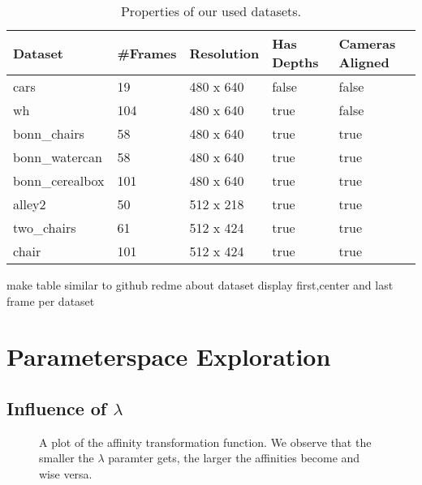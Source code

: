 \begin{table}[H]
\centering
\begin{tabular}{|l|l|l|l|l|}
\hline
\textbf{Dataset} & \textbf{\#Frames} & \textbf{Resolution} & \textbf{Has Depths} & \textbf{Cameras Aligned} \\ \hline
cars & 19 & 480 x 640 & false & false \\ \hline
wh & 104 & 480 x 640 & true & false \\ \hline
bonn\_chairs & 58 & 480 x 640 & true & true \\ \hline
bonn\_watercan & 58 & 480 x 640 & true & true \\ \hline
bonn\_cerealbox & 101 & 480 x 640 & true & true \\ \hline
alley2 & 50 & 512 x 218 & true & true \\ \hline
two\_chairs & 61 & 512 x 424 & true & true \\ \hline
chair & 101 & 512 x 424 & true & true \\ \hline
\end{tabular}
\caption[Datasets]{Properties of our used datasets.}
\label{tab:datasets}
\end{table}


make table similar to github redme about dataset
display first,center and last frame per dataset

\section{Parameterspace Exploration}
\subsection{Influence of $\lambda$}

\begin{figure}[H]
\centering
{}
\caption[Affinity Function]{A plot of the affinity transformation function. We observe that the smaller the $\lambda$ paramter gets, the larger the affinities become and wise versa.}
\label{fig:exp_effect_lambda}
\end{figure}


